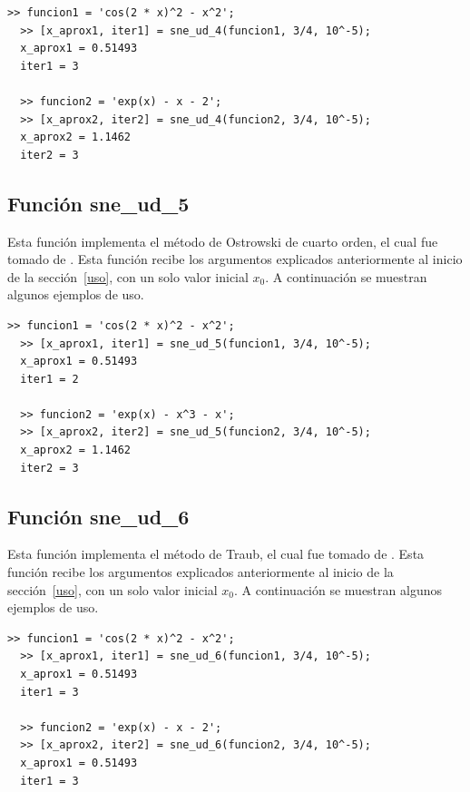 \documentclass[12pt]{article}
\begin{document}
\begin{minipage}{\linewidth}
\begin{lstlisting}[frame = single]
  >> funcion1 = 'cos(2 * x)^2 - x^2';
  >> [x_aprox1, iter1] = sne_ud_4(funcion1, 3/4, 10^-5);
  x_aprox1 = 0.51493
  iter1 = 3

  >> funcion2 = 'exp(x) - x - 2';
  >> [x_aprox2, iter2] = sne_ud_4(funcion2, 3/4, 10^-5);
  x_aprox2 = 1.1462
  iter2 = 3

\end{lstlisting}
\end{minipage}

\subsection{Función sne\_ud\_5}
Esta función implementa el método de Ostrowski de cuarto orden, el cual fue tomado de \cite{behl2015construction}. Esta función recibe los argumentos explicados anteriormente al inicio de la sección~\ref{uso}, con un solo valor inicial $x_{0}$. A continuación se muestran algunos ejemplos de uso.

\begin{minipage}{\linewidth}
\begin{lstlisting}[frame = single]
  >> funcion1 = 'cos(2 * x)^2 - x^2';
  >> [x_aprox1, iter1] = sne_ud_5(funcion1, 3/4, 10^-5);
  x_aprox1 = 0.51493
  iter1 = 2

  >> funcion2 = 'exp(x) - x^3 - x';
  >> [x_aprox2, iter2] = sne_ud_5(funcion2, 3/4, 10^-5);
  x_aprox2 = 1.1462
  iter2 = 3

\end{lstlisting}
\end{minipage}

\subsection{Función sne\_ud\_6}
Esta función implementa el método de Traub, el cual fue tomado de \cite{budzko2015new}. Esta función recibe los argumentos explicados anteriormente al inicio de la sección~\ref{uso}, con un solo valor inicial $x_{0}$. A continuación se muestran algunos ejemplos de uso.

\begin{minipage}{\linewidth}
\begin{lstlisting}[frame = single]
  >> funcion1 = 'cos(2 * x)^2 - x^2';
  >> [x_aprox1, iter1] = sne_ud_6(funcion1, 3/4, 10^-5);
  x_aprox1 = 0.51493
  iter1 = 3

  >> funcion2 = 'exp(x) - x - 2';
  >> [x_aprox2, iter2] = sne_ud_6(funcion2, 3/4, 10^-5);
  x_aprox1 = 0.51493
  iter1 = 3

\end{lstlisting}
\end{minipage}
\end{document}
